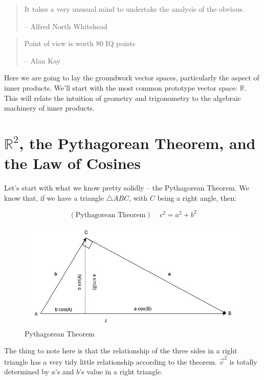 \documentclass[
]{book}
\begin{document}
\begin{quote}
It takes a very unusual mind to undertake the analysis of the obvious.

-- Alfred North Whitehead
\end{quote}

\begin{quote}
Point of view is worth 80 IQ points

-- Alan Kay
\end{quote}

Here we are going to lay the groundwork vector spaces, particularly the aspect of inner products. We'll start with the most common prototype vector space: \(\mathbb{R}\). This will relate the intuition of geometry and trigonometry to the algebraic machinery of inner products.

\hypertarget{mathbbr2-the-pythagorean-theorem-and-the-law-of-cosines}{%
\section{\texorpdfstring{\(\mathbb{R}^2\), the Pythagorean Theorem, and the Law of Cosines}{\textbackslash mathbb\{R\}\^{}2, the Pythagorean Theorem, and the Law of Cosines}}\label{mathbbr2-the-pythagorean-theorem-and-the-law-of-cosines}}

Let's start with what we know pretty solidly -- the Pythagorean Theorem. We know that, if we have a triangle \(\triangle ABC\), with \(C\) being a right angle, then:

\[(\text{Pythagorean Theorem}) \ \ \ \ \ c^2 = a^2 + b^2\]

\begin{figure}

{\centering \includegraphics[width=0.75\linewidth,height=0.75\textheight]{images/LofC-PythThm} 

}

\caption{Pythagorean Theorem}\label{fig:unnamed-chunk-7}
\end{figure}

The thing to note here is that the relationship of the three sides in a right triangle has a very tidy little relationship according to the theorem. \(\vec{c}^2\) is totally determined by \(a\)'s and \(b\)'s value in a right triangle.
\end{document}
